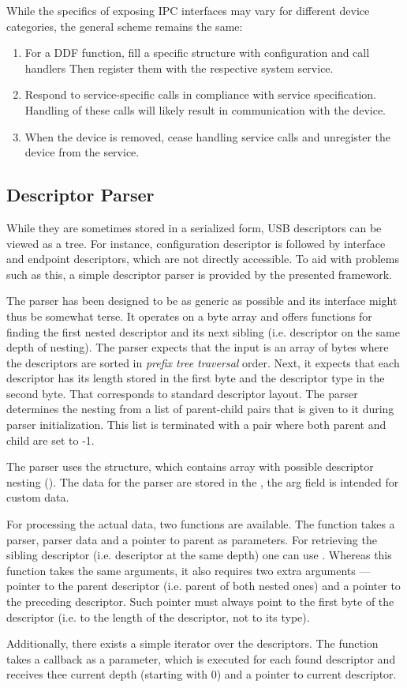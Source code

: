 While the specifics of exposing IPC interfaces may vary for different device
categories, the general scheme remains the same:
%
\begin{enumerate}
	\item For a DDF function, fill a specific structure with configuration and
		call handlers Then register them with the respective system service.
	\item Respond to service-specific calls in compliance with service
		specification. Handling of these calls will likely result in
		communication with the device.
	\item When the device is removed, cease handling service calls and
		unregister the device from the service.
\end{enumerate}


\subsection{Descriptor Parser}

While they are sometimes stored in a serialized form, USB descriptors can be
viewed as a tree. For instance, configuration descriptor is followed by
interface and endpoint descriptors, which are not directly accessible. To aid
with problems such as this, a simple descriptor parser is provided by the
presented framework.

The parser has been designed to be as generic as possible and its interface
might thus be somewhat terse. It operates on a byte array and offers functions
for finding the first nested descriptor and its next sibling (i.e. descriptor on
the same depth of nesting). The parser expects that the input is an array of
bytes where the descriptors are sorted in \textit{prefix tree traversal} order.
Next, it expects that each descriptor has its length stored in the first byte
and the descriptor type in the second byte. That corresponds to standard
descriptor layout. The parser determines the nesting from a list of parent-child
pairs that is given to it during parser initialization. This list is terminated
with a pair where both parent and child are set to -1.

The parser uses the  structure, which contains array
with possible descriptor nesting (). The
data for the parser are stored in the , the arg
field is intended for custom data.

For processing the actual data, two functions are available. The
 function takes a parser, parser data and
a pointer to parent as parameters. For retrieving the sibling descriptor (i.e.
descriptor at the same depth) one can use .
Whereas this function takes the same arguments, it also requires two extra
arguments — pointer to the parent descriptor (i.e. parent of both nested ones)
and a pointer to the preceding descriptor. Such pointer must always point to
the first byte of the descriptor (i.e. to the length of the descriptor, not to
its type).

Additionally, there exists a simple iterator over the descriptors. The
function  takes a callback as a parameter, which is
executed for each found descriptor and receives thee current depth (starting
with 0) and a pointer to current descriptor.
